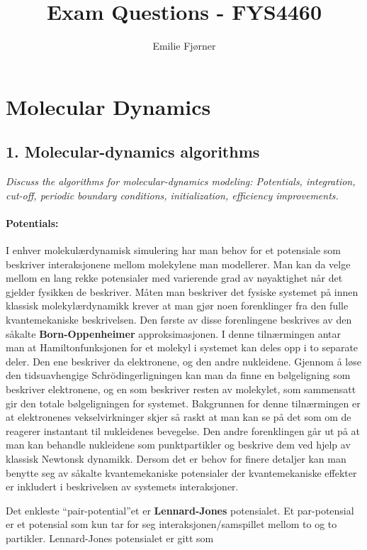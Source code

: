 \documentclass[a4paper,10pt]{article}
\title{Exam Questions - FYS4460}
\author{Emilie Fjørner}
\begin{document}
\maketitle


\section*{Molecular Dynamics}


\subsection*{1. Molecular-dynamics algorithms}

\textit{Discuss the algorithms for molecular-dynamics modeling: Potentials, integration, cut-off, periodic boundary conditions, initialization, efficiency improvements.}


\paragraph{Potentials:}
I enhver molekulærdynamisk simulering har man behov for et potensiale som beskriver interaksjonene mellom molekylene man modellerer. Man kan da velge mellom en lang rekke potensialer med varierende grad av nøyaktighet når det gjelder fysikken de beskriver. 
Måten man beskriver det fysiske systemet på innen klassisk molekylærdynamikk krever at man gjør noen forenklinger fra den fulle kvantemekaniske beskrivelsen. Den første av disse forenlingene beskrives av den såkalte \textbf{Born-Oppenheimer} approksimasjonen. I denne tilnærmingen antar man at Hamiltonfunksjonen for et molekyl i systemet kan deles opp i to separate deler. Den ene beskriver da elektronene, og den andre nukleidene. Gjennom å løse den tidsuavhengige Schrödingerligningen kan man da finne en bølgeligning som beskriver elektronene, og en som beskriver resten av molekylet, som sammensatt gir den totale bølgeligningen for systemet. Bakgrunnen for denne tilnærmingen er at elektronenes vekselvirkninger skjer så raskt at man kan se på det som om de reagerer instantant til nukleidenes bevegelse. 
Den andre forenklingen går ut på at man kan behandle nukleidene som punktpartikler og beskrive dem ved hjelp av klassisk Newtonsk dynamikk. Dersom det er behov for finere detaljer kan man benytte seg av såkalte kvantemekaniske potensialer der kvantemekaniske effekter er inkludert i beskrivelsen av systemets interaksjoner. 

Det enkleste ``pair-potential''et er \textbf{Lennard-Jones} potensialet. Et par-potensial er et potensial som kun tar for seg interaksjonen/samspillet mellom to og to partikler. Lennard-Jones potensialet er gitt som 
\end{document}
